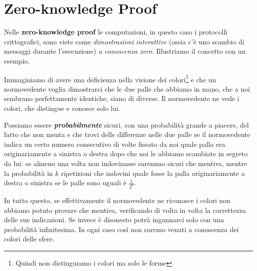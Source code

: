 \documentclass{article}
\begin{document}
\section{Zero-knowledge Proof}


Nelle \textbf{zero-knowledge proof} le computazioni, in questo caso i protocolli crittografici, sono viste come \textit{dimostrazioni} \textit{interattive} (ossia c'è uno scambio di messaggi durante l'esecuzione) \textit{a conoscenza zero}.
Illustriamo il concetto con un esempio. 

Immaginiamo di avere una deficienza nella visione dei colori\footnote{Quindi non distinguiamo i colori ma solo le forme} e che un normovedente voglia dimostrarci che le due palle che abbiamo in mano, che a noi sembrano perfettamente identiche, siano di diverse. Il normovedente ne vede i colori, che distingue e conosce solo lui. 

Possiamo essere \textbf{\textit{probabilmente}} sicuri, con una probabilità grande a piacere, del fatto che non menta e che trovi delle differenze nelle due palle se il normovedente indica un certo numero consecutivo di volte fissato da noi quale palla era originariamente a sinistra o destra dopo che noi le abbiamo scambiate in segreto da lui: se almeno una volta non indovinasse saremmo sicuri che mentiva, mentre la probabilità in $k$ ripetizioni che indovini quale fosse la palla originariamente a destra o sinistra se le palle sono uguali è $\frac{1}{2^k}$. 

In tutto questo, se effettivamente il normovedente ne riconosce i colori non abbiamo potuto provare che mentiva, verificando di volta in volta la correttezza delle sue indicazioni. Se invece è disonesto potrà ingannarci solo con una probabilità infinitesima. In ogni caso così non saremo venuti a conoscenza dei colori delle sfere.
\end{document}
